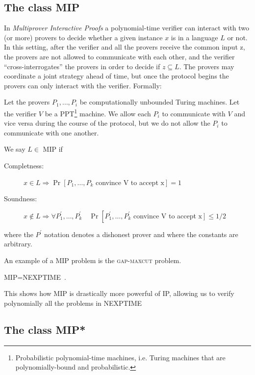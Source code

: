 \subsection{The class MIP}
In \emph{Multiprover Interactive Proofs} a polynomial-time verifier can interact with two (or more) provers to decide
whether a given instance $x$ is in a language $L$ or not. In this setting, after the verifier and all the provers receive the common input z, the provers are not allowed to communicate with each other, and the verifier “cross-interrogates” the provers in order to decide if $z \subseteq L$. The provers may coordinate a joint strategy ahead of time, but once the protocol begins the provers can only interact with the verifier. Formally:
\begin{defn}
    Let the provers $P_{1}, \ldots, P_{i}$ be computationally unbounded Turing machines. Let the verifier $V$ be a PPT\footnote{Probabilistic polynomial-time machines, i.e. Turing machines that are polynomially-bound and probabilistic.} machine. We allow each $P_{i}$ to communicate with $V$ and vice versa during the course of the protocol, but we do not allow the $P_{i}$ to communicate with one another. 
    
    We say $L \in$ MIP if 
    \begin{description}
\item[Completness: ]$x \in L \Rightarrow \operatorname{Pr}\left[P_{1}, \ldots, P_{k}\right.$ convince $\mathrm{V}$ to accept $\left.\mathrm{x}\right]=1$
\item[Soundness: ]$x \notin L \Rightarrow \forall P_{1}^{\prime}, \ldots, P_{k}^{\prime} \quad \operatorname{Pr}\left[P_{1}^{\prime}, \ldots, P_{k}^{\prime}\right.$ convince $\mathrm{V}$ to accept $\left.\mathrm{x}\right] \leq 1 / 2$
    \end{description}   
    where the $P^{\prime}$ notation denotes a dishonest prover and where the constants are arbitrary.
\end{defn}

An example of a MIP problem is the \textsc{gap-maxcut} problem.
\begin{theorem}
MIP=NEXPTIME~\cite{topicsin}.
\end{theorem}

This shows how MIP is drastically more powerful of IP, allowing us to verify polynomially all the problems in NEXPTIME


\subsection{The class MIP*}


